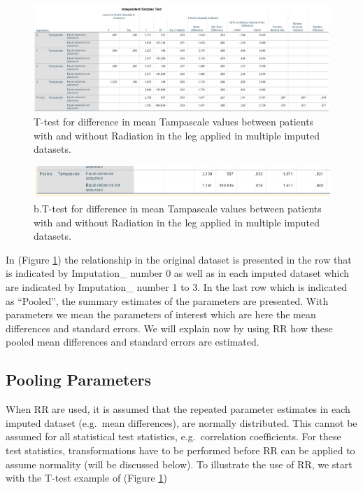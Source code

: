 \documentclass[]{book}
\theoremstyle{definition}
\theoremstyle{definition}
\theoremstyle{definition}
\theoremstyle{remark}
\begin{document}
\begin{figure}

{\centering \includegraphics[width=0.9\linewidth]{images/table5.1} 

}

\caption{T-test for difference in mean Tampascale values between patients with and without Radiation in the leg applied in multiple imputed datasets.}\label{fig:tab5-1a}
\end{figure}

\begin{figure}

{\centering \includegraphics[width=0.9\linewidth]{images/table5.1b} 

}

\caption{b.T-test for difference in mean Tampascale values between patients with and without Radiation in the leg applied in multiple imputed datasets.}\label{fig:tab5-1b}
\end{figure}

In (Figure \ref{fig:tab5-1a}) the relationship in the original dataset
is presented in the row that is indicated by Imputation\_ number 0 as
well as in each imputed dataset which are indicated by Imputation\_
number 1 to 3. In the last row which is indicated as ``Pooled'', the
summary estimates of the parameters are presented. With parameters we
mean the parameters of interest which are here the mean differences and
standard errors. We will explain now by using RR how these pooled mean
differences and standard errors are estimated.

\subsection{Pooling Parameters}\label{pooling-parameters}

When RR are used, it is assumed that the repeated parameter estimates in
each imputed dataset (e.g.~mean differences), are normally distributed.
This cannot be assumed for all statistical test statistics,
e.g.~correlation coefficients. For these test statistics,
transformations have to be performed before RR can be applied to assume
normality (will be discussed below). To illustrate the use of RR, we
start with the T-test example of (Figure \ref{fig:tab5-1a})
\end{document}
